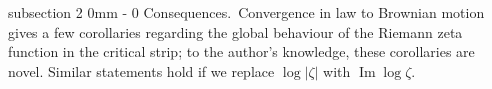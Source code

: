 \documentclass{article}
\makeatletter
\DeclareMathOperator{\Cov}{Cov}
\newcommand{\phe}{\varphi}
\newcommand{\ds}{\displaystyle}
\DeclareMathOperator{\Var}{Var}
\DeclareMathOperator{\Ima}{Im}
\newcommand{\1}{\mathds{1}}
\numberwithin{equation}{section}
\newcommand{\eps}{\varepsilon}
\theoremstyle{plain} %
\renewcommand{\subsection}{\@startsection
{subsection}%
{2}%
{0mm}%
{-\baselineskip}%
{0 \baselineskip}%
{\normalfont\bf\itshape}} %
\newcommand{\hf}{\frac{1}{2}}
\makeatother
\begin{document}
%
%
%


\subsection{Consequences.}\  Convergence in law to Brownian motion gives a few corollaries regarding the global behaviour of the Riemann zeta function in the critical strip; to the author's knowledge, these corollaries are novel.
Similar statements hold if we replace $\log |\zeta|$ with $\Ima \log \zeta$.
\end{document}
